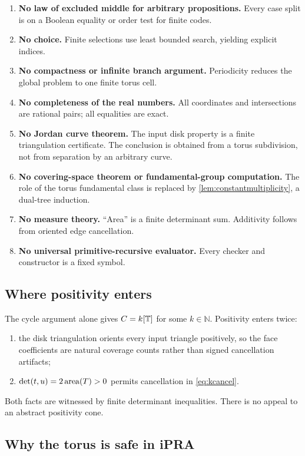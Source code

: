\begin{enumerate}[label=(\arabic*)]
\item \textbf{No law of excluded middle for arbitrary propositions.}  Every case split is on a Boolean equality or order test for finite codes.
\item \textbf{No choice.}  Finite selections use least bounded search, yielding explicit indices.
\item \textbf{No compactness or infinite branch argument.}  Periodicity reduces the global problem to one finite torus cell.
\item \textbf{No completeness of the real numbers.}  All coordinates and intersections are rational pairs; all equalities are exact.
\item \textbf{No Jordan curve theorem.}  The input disk property is a finite triangulation certificate.  The conclusion is obtained from a torus subdivision, not from separation by an arbitrary curve.
\item \textbf{No covering-space theorem or fundamental-group computation.}  The role of the torus fundamental class is replaced by \cref{lem:constantmultiplicity}, a dual-tree induction.
\item \textbf{No measure theory.}  ``Area'' is a finite determinant sum.  Additivity follows from oriented edge cancellation.
\item \textbf{No universal primitive-recursive evaluator.}  Every checker and constructor is a fixed symbol.
\end{enumerate}

\subsection{Where positivity enters}

The cycle argument alone gives \(C=k[\mathbb T]\) for some \(k\in\mathbb N\).  Positivity enters twice:
\begin{enumerate}[label=(\alph*)]
\item the disk triangulation orients every input triangle positively, so the face coefficients are natural coverage counts rather than signed cancellation artifacts;
\item \(\det(t,u)=2\operatorname{area}(T)>0\) permits cancellation in \cref{eq:kcancel}.
\end{enumerate}
Both facts are witnessed by finite determinant inequalities.  There is no appeal to an abstract positivity cone.

\subsection{Why the torus is safe in iPRA}

